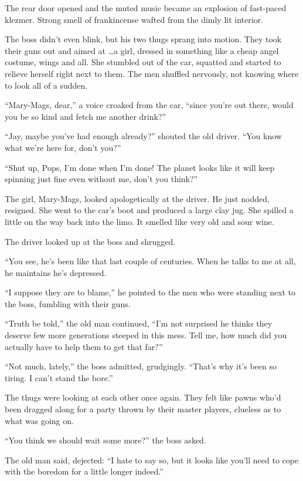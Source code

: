The rear door opened and the muted music became an explosion of fast-paced klezmer. Strong smell of frankincense wafted from the dimly lit interior. 

The boss didn't even blink, but his two thugs sprang into motion. They took their guns out and aimed at \dots a girl, dressed in something like a cheap angel costume, wings and all. She stumbled out of the car, squatted and started to relieve herself right next to them. The men shuffled nervously, not knowing where to look all of a sudden.

``Mary-Mags, dear,'' a voice croaked from the car, ``since you're out there, would you be so kind and fetch me another drink?''
 
``Jay, maybe you've had enough already?'' shouted the old driver. ``You know what we're here for, don't you?''
 
``Shut up, Pops, I'm done when I'm done! The planet looks like it will keep spinning just fine even without me, don't you think?''

The girl, Mary-Mags, looked apologetically at the driver. He just nodded, resigned. She went to the car's boot and produced a large clay jug. She spilled a little on the way back into the limo. It smelled like very old and sour wine.

The driver looked up at the boss and shrugged. 

``You see, he's been like that last couple of centuries. When he talks to me at all, he maintains he's depressed. 

``I suppose they are to blame,'' he pointed to the men who were standing next to the boss, fumbling with their guns. 

``Truth be told,'' the old man continued, ``I'm not surprised he thinks they deserve few more generations steeped in this mess. Tell me, how much did you actually have to help them to get that far?''

``Not much, lately,'' the boss admitted, grudgingly. ``That's why it's been so tiring. I can't stand the bore.''

The thugs were looking at each other once again. They felt like pawns who'd been dragged along for a party thrown by their master players, clueless as to what was going on.
 
``You think we should wait some more?'' the boss asked.
 
The old man said, dejected: ``I hate to say so, but it looks like you'll need to cope with the boredom for a little longer indeed.''
 

